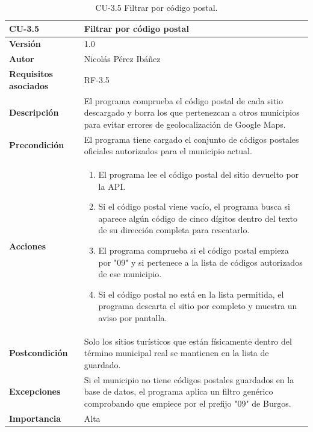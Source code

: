 \begin{table}[p]
	\centering
	\begin{tabularx}{\linewidth}{ p{} p{} }
		\toprule
		\textbf{CU-3.5}  & \textbf{Filtrar por código postal}\\
		\toprule
		\textbf{Versión}              & 1.0    \\
		\textbf{Autor}                & Nicolás Pérez Ibáñez \\
		\textbf{Requisitos asociados} & RF-3.5 \\
		\textbf{Descripción}          & El programa comprueba el código postal de cada sitio descargado y borra los que pertenezcan a otros municipios para evitar errores de geolocalización de Google Maps. \\
		\textbf{Precondición}         & El programa tiene cargado el conjunto de códigos postales oficiales autorizados para el municipio actual. \\
		\textbf{Acciones}             &
		\begin{enumerate}
			\def\labelenumi{\arabic{enumi}.}
			\tightlist
			\item El programa lee el código postal del sitio devuelto por la API.
			\item Si el código postal viene vacío, el programa busca si aparece algún código de cinco dígitos dentro del texto de su dirección completa para rescatarlo.
			\item El programa comprueba si el código postal empieza por "09" y si pertenece a la lista de códigos autorizados de ese municipio.
			\item Si el código postal no está en la lista permitida, el programa descarta el sitio por completo y muestra un aviso por pantalla.
		\end{enumerate}\\
		\textbf{Postcondición}        & Solo los sitios turísticos que están físicamente dentro del término municipal real se mantienen en la lista de guardado. \\
		\textbf{Excepciones}          & Si el municipio no tiene códigos postales guardados en la base de datos, el programa aplica un filtro genérico comprobando que empiece por el prefijo "09" de Burgos. \\
		\textbf{Importancia}          & Alta \\
		\bottomrule
	\end{tabularx}
	\caption{CU-3.5 Filtrar por código postal.}
\end{table}

